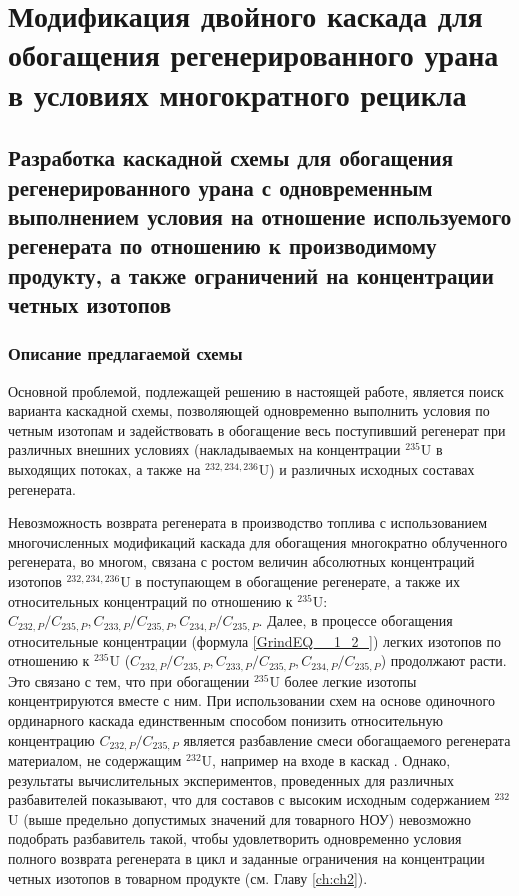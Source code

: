 \chapter{Модификация двойного каскада для обогащения регенерированного урана в условиях многократного рецикла}\label{ch:ch3}

\section{Разработка каскадной схемы для обогащения регенерированного урана с одновременным выполнением условия на отношение используемого регенерата по отношению к производимому продукту, а также ограничений на концентрации четных изотопов}
\subsection{Описание предлагаемой схемы}\label{triple_descr}

Основной проблемой, подлежащей решению в настоящей работе, является поиск варианта каскадной схемы, позволяющей одновременно выполнить условия по четным изотопам и задействовать в обогащение весь поступивший регенерат при различных внешних условиях (накладываемых на концентрации $^{235}$U в выходящих потоках, а также на $^{232,234,236}$U) и различных исходных составах регенерата.

Невозможность возврата регенерата в производство топлива с использованием многочисленных модификаций каскада для обогащения многократно облученного регенерата, во многом, связана с ростом величин абсолютных концентраций изотопов $^{232,234,236}$U в поступающем в обогащение регенерате, а также их относительных концентраций по отношению к $^{235}$U:  ${C_{232,{P}}}/{C_{235,{P}}},{C_{233,{P}}}/{C_{235,{P}}},{C_{234,{P}}}/{C_{235,{P}}}$. Далее, в процессе обогащения относительные концентрации (формула \ref{GrindEQ__1_2_}) легких изотопов по отношению к $^{235}$U (${C_{232,{P}}}/{C_{235,{P}}},{C_{233,{P}}}/{C_{235,{P}}},{C_{234,{P}}}/{C_{235,{P}}}$) продолжают расти. Это связано с тем, что при обогащении $^{235}$U более легкие изотопы концентрируются вместе с ним. При использовании схем на основе одиночного ординарного каскада единственным способом понизить относительную концентрацию ${C_{232,{P}}}/{C_{235,{P}}}$ является разбавление смеси обогащаемого регенерата материалом, не содержащим $^{232}$U, например на входе в каскад \cite{smirnovKaskadnyeShemyZadachah2012}. Однако, результаты вычислительных экспериментов, проведенных для различных разбавителей показывают, что для составов с высоким исходным содержанием $^{232}$U (выше предельно допустимых значений для товарного НОУ) невозможно подобрать разбавитель такой, чтобы удовлетворить одновременно условия полного возврата регенерата в цикл и заданные ограничения на концентрации четных изотопов в товарном продукте (см. Главу \ref{ch:ch2}). 

